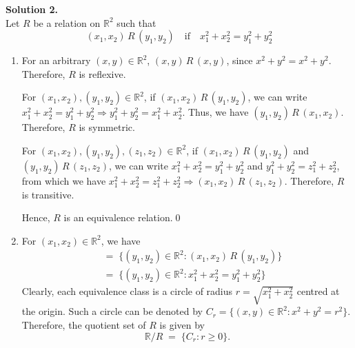 \documentclass[10pt]{article}
\begin{document}
        \textbf{Solution 2.}\\
        Let $R$ be a relation on $\mathbb{R}^2$ such that
        \[(x_1, x_2)\,R\,(y_1, y_2) \quad\text{if}\quad x_1^2 + x_2^2 = y_1^2 + y_2^2\]
        \begin{enumerate}
                \item For an arbitrary $(x, y) \in \mathbb{R}^2$, $(x, y)\,R\,(x, y)$, since $x^2 + y^2 = x^2 + y^2$. Therefore, $R$
                is reflexive.

                For $(x_1, x_2), (y_1, y_2) \in \mathbb{R}^2$, if $(x_1, x_2)\,R\,(y_1, y_2)$, we can write 
                $x_1^2 + x_2^2 = y_1^2 + y_2^2 \Rightarrow y_1^2 + y_2^2 = x_1^2 + x_2^2$. Thus, we have $(y_1, y_2)\,R\,(x_1, x_2)$.
                Therefore, $R$ is symmetric.

                For $(x_1, x_2), (y_1, y_2), (z_1, z_2) \in \mathbb{R}^2$, if $(x_1, x_2)\,R\,(y_1, y_2)$ and $(y_1, y_2)\,R\,(z_1, z_2)$,
                we can write $x_1^2 + x_2^2 = y_1^2 + y_2^2$ and $y_1^2 + y_2^2 = z_1^2 + z_2^2$, from which we have
                $x_1^2 + x_2^2 = z_1^2 + z_2^2 \Rightarrow (x_1, x_2)\,R\,(z_1, z_2)$. Therefore, $R$ is transitive.

                Hence, $R$ is an equivalence relation.\qed
                
                \item For $(x_1, x_2) \in \mathbb{R}^2$, we have
                \begin{align*}
                [(x_1, x_2)] \;&=\; \{(y_1, y_2) \in \mathbb{R}^2 : (x_1, x_2)\,R\,(y_1, y_2)\} \\
                        \;&=\; \{(y_1, y_2) \in \mathbb{R}^2 : x_1^2 + x_2^2 = y_1^2 + y_2^2\}
                \end{align*}
                Clearly, each equivalence class is a circle of radius $r = \sqrt{x_1^2 + x_2^2}$ centred at the origin.
                Such a circle can be denoted by $C_r = \{(x, y) \in \mathbb{R}^2 : x^2 + y^2 = r^2\}$.
                Therefore, the quotient set of $R$ is given by $$\mathbb{R}/R \;=\; \{C_r : r \geq 0\}.$$
                
        \end{enumerate}
\end{document}

